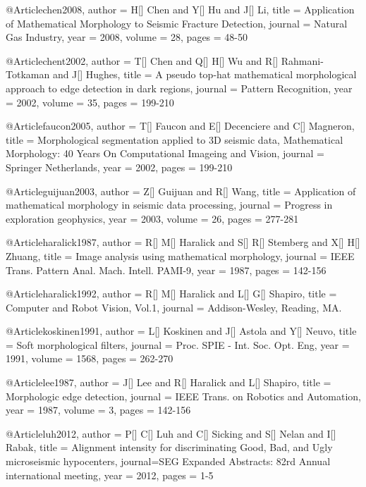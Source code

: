     @Article{chen2008,
  author = 	 {H[] Chen and Y[] Hu and J[] Li},
  title = 	 {Application of Mathematical Morphology to Seismic Fracture Detection},
  journal = 	 {Natural Gas Industry},
  year = 	 2008,
  volume = 	 28,
  pages = 	 {48-50}}   
  
    @Article{chent2002,
  author = 	 {T[] Chen and Q[] H[] Wu and R[] Rahmani-Totkaman and J[] Hughes},
  title = 	 {A pseudo top-hat mathematical
morphological approach to edge detection in dark regions},
  journal = 	 {Pattern Recognition},
  year = 	 2002,
  volume = 	 35,
  pages = 	 {199-210}}   
  
@Article{faucon2005,
  author = 	 {T[] Faucon and E[] Decenciere and C[] Magneron},
  title = 	 {Morphological segmentation applied to 3{D} seismic data, Mathematical Morphology: 40 Years On Computational Imageing and Vision},
  journal = 	 {Springer Netherlands},
  year = 	 2002,
  pages = 	 {199-210}}      
  
    @Article{guijuan2003,
  author = 	 {Z[] Guijuan and R[] Wang},
  title = 	 {Application of mathematical morphology in seismic data processing},
  journal = 	 {Progress in exploration geophysics},
  year = 	 2003,
  volume = 	 26,
  pages = 	 {277-281}}     
   
@Article{haralick1987,
  author = 	 {R[] M[] Haralick and S[] R[] Stemberg and X[] H[] Zhuang},
  title = 	 {Image analysis using mathematical morphology},
  journal = 	 {IEEE Trans. Pattern Anal. Mach. Intell. PAMI-9},
  year = 	 1987,
  pages = 	 {142-156}}    
  
@Article{haralick1992,
  author = 	 {R[] M[] Haralick and L[] G[] Shapiro},
  title = 	 {Computer and Robot Vision, Vol.1},
  journal = 	 {Addison-Wesley, Reading,
MA.}}   
  
   @Article{koskinen1991,
  author = 	 {L[] Koskinen and J[] Astola and Y[] Neuvo},
  title = 	 {Soft morphological filters},
  journal = 	 {Proc. SPIE - Int. Soc. Opt. Eng},
  year = 	 1991,
    volume = 	 1568,
  pages = 	 {262-270}}     
  
     @Article{lee1987,
  author = 	 {J[] Lee and R[] Haralick and L[] Shapiro},
  title = 	 {Morphologic edge detection},
  journal = 	 {IEEE Trans. on Robotics and
Automation},
  year = 	 1987,
  volume = 	 3,
  pages = 	 {142-156}}   

     @Article{luh2012,
  author = 	 {P[] C[] Luh and C[] Sicking and S[] Nelan and I[] Rabak},
  title = 	 {Alignment intensity for discriminating Good, Bad, and Ugly microseismic hypocenters},
  journal={SEG Expanded Abstracts: 82rd Annual international meeting},
  year = 	 2012,
  pages = 	 {1-5}}  

